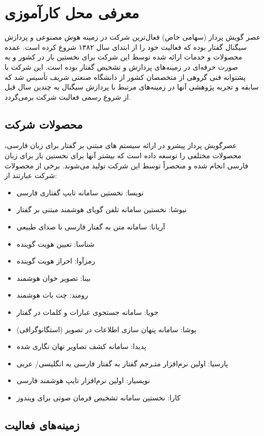\chapter{معرفی محل کارآموزی}

عصر گویش پرداز (سهامی خاص) فعال‌ترین شرکت در زمینه هوش مصنوعی و پردازش سیگنال گفتار بوده كه فعالیت خود را از ابتدای سال ۱۳۸۲ شروع كرده است. عمده محصولات و خدمات ارائه شده توسط این شرکت برای نخستین بار در کشور و به صورت حرفه‌ای در زمینه‌های پردازش و تشخیص گفتار بوده است. این شرکت با پشتوانه فنی گروهی از متخصصان کشور از دانشگاه صنعتی شریف تأسیس شد که سابقه و تجربه پژوهشی آنها در زمینه‌های مرتبط با پردازش سیگنال به چندین سال قبل از شروع رسمی فعالیت شرکت برمی‌گردد.

\section{محصولات شرکت}

عصرگویش پرداز پیشرو در ارائه سیستم های مبتنی بر گفتار برای زبان فارسی، محصولات مختلفی را توسعه داده است که بیشتر آنها برای نخستین بار برای زبان فارسی انجام شده و منحصراً توسط این شرکت تولید می‌شوند. برخی از محصولات شرکت عبارتند از:
\begin{itemize}
	\item نویسا: نخستین سامانه تایپ گفتاری فارسی
	\item نیوشا: نخستین سامانه تلفن گویای هوشمند مبتنی بر گفتار
	\item آریانا: سامانه متن به گفتار فارسی با صدای طبیعی
	\item شناسا: تعیین هویت گوینده
	\item رمزآوا: احراز هویت گوینده
	\item بینا: تصویر خوان هوشمند
	\item رومند: چت بات هوشمند
	\item جویا: سامانه جستجوی عبارات و کلمات در گفتار
	\item پوشا: سامانه پنهان سازی اطلاعات در تصویر (استگانوگرافی)
	\item پدیدا: سامانه کشف تصاویر نهان نگاری شده
	\item پارسیا: اولین نرم‌افزار متـرجم گفتار به گفتار فارسی به انگلیسی/ عربی
	\item نویسیار: اولین نرم‌افزار تایپ هوشمند فارسی
	\item کارا: نخستین سامانه تشخیص فرمان صوتی برای ویندوز
\end{itemize}

\section{زمینه‌های فعالیت}

